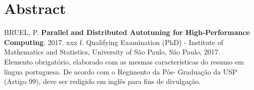 \documentclass[12pt,twoside,a4paper]{book}
\makeatletter
\def\thickhrulefill{\leavevmode \leaders \hrule height .1ex \hfill \kern \z@}
\makeatother
\begin{document}



%
%
%
%

\chapter*{Abstract}
\noindent BRUEL, P. \textbf{Parallel and Distributed Autotuning for High-Performance Computing}.
2017. xxx f.
Qualifying Examination (PhD) - Institute of Mathematics and Statistics,
University of São Paulo, São Paulo, 2017.
\\


Elemento obrigatório, elaborado com as mesmas características do resumo em
língua portuguesa. De acordo com o Regimento da Pós- Graduação da USP (Artigo
99), deve ser redigido em inglês para fins de divulgação.
\\
\end{document}

